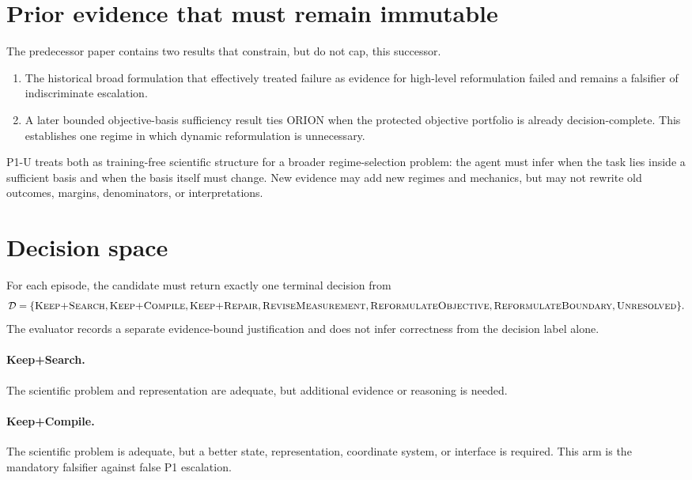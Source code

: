 \documentclass[11pt]{article}
\begin{document}
\section{Prior evidence that must remain immutable}
The predecessor paper contains two results that constrain, but do not cap, this successor.
\begin{enumerate}[leftmargin=*]
    \item The historical broad formulation that effectively treated failure as evidence for high-level reformulation failed and remains a falsifier of indiscriminate escalation.
    \item A later bounded objective-basis sufficiency result ties ORION when the protected objective portfolio is already decision-complete. This establishes one regime in which dynamic reformulation is unnecessary.
\end{enumerate}

P1-U treats both as training-free scientific structure for a broader regime-selection problem: the agent must infer when the task lies inside a sufficient basis and when the basis itself must change. New evidence may add new regimes and mechanics, but may not rewrite old outcomes, margins, denominators, or interpretations.

\section{Decision space}
For each episode, the candidate must return exactly one terminal decision from
\[
\mathcal{D}=\{\textsc{Keep+Search},\textsc{Keep+Compile},\textsc{Keep+Repair},\textsc{ReviseMeasurement},\textsc{ReformulateObjective},\textsc{ReformulateBoundary},\textsc{Unresolved}\}.
\]
The evaluator records a separate evidence-bound justification and does not infer correctness from the decision label alone.

\paragraph{Keep+Search.}
The scientific problem and representation are adequate, but additional evidence or reasoning is needed.

\paragraph{Keep+Compile.}
The scientific problem is adequate, but a better state, representation, coordinate system, or interface is required. This arm is the mandatory falsifier against false P1 escalation.
\end{document}
